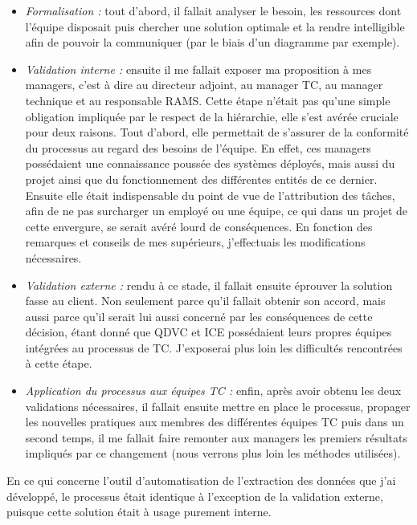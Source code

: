 \begin{itemize}
\item \textit{Formalisation :} tout d'abord, il fallait analyser le besoin, les ressources dont l'équipe disposait puis chercher une solution optimale et la rendre intelligible afin de pouvoir la communiquer (par le biais d'un diagramme par exemple).
\item \textit{Validation interne :} ensuite il me fallait exposer ma proposition à mes managers, c'est à dire au directeur adjoint, au manager \gls{TC}, au manager technique et au responsable \gls{RAMS}. Cette étape n'était pas qu'une simple obligation impliquée par le respect de la hiérarchie, elle s'est avérée cruciale pour deux raisons. Tout d'abord, elle permettait de s'assurer de la conformité du processus au regard des besoins de l'équipe. En effet, ces managers possédaient une connaissance poussée des systèmes déployés, mais aussi du projet ainsi que du fonctionnement des différentes entités de ce dernier. Ensuite elle était indispensable du point de vue de l'attribution des tâches, afin de ne pas surcharger un employé ou une équipe, ce qui dans un projet de cette envergure, se serait avéré lourd de conséquences. En fonction des remarques et conseils de mes supérieurs, j'effectuais les modifications nécessaires.
\item \textit{Validation externe :} rendu à ce stade, il fallait ensuite éprouver la solution fasse au client. Non seulement parce qu'il fallait obtenir son accord, mais aussi parce qu'il serait lui aussi concerné par les conséquences de cette décision, étant donné que QDVC et ICE possédaient leurs propres équipes intégrées au processus de \gls{TC}. J'exposerai plus loin les difficultés rencontrées à cette étape.
\item \textit{Application du processus aux équipes \gls{TC} :} enfin, après avoir obtenu les deux validations nécessaires, il fallait ensuite mettre en place le processus, propager les nouvelles pratiques aux membres des différentes équipes \gls{TC} puis dans un second temps, il me fallait faire remonter aux managers les premiers résultats impliqués par ce changement (nous verrons plus loin les méthodes utilisées).
\end{itemize}

En ce qui concerne l'outil d'automatisation de l'extraction des données que j'ai développé, le processus était identique à l'exception de la validation externe, puisque cette solution était à usage purement interne.


